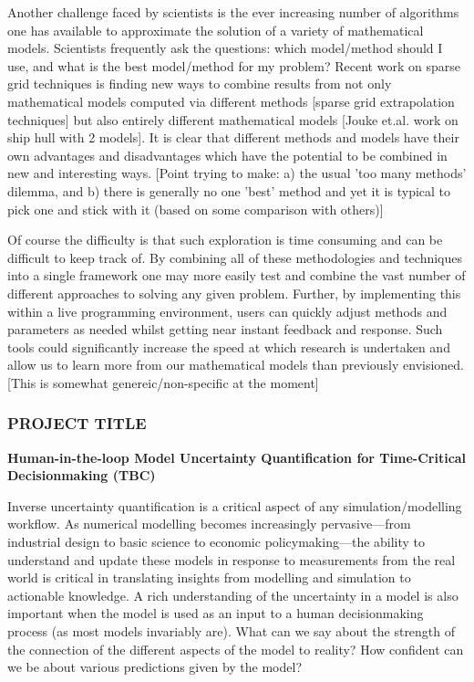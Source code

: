 \documentclass[a4paper,fontsize=12pt]{scrartcl}
\begin{document}
Another challenge faced by scientists is the ever increasing number of
algorithms one has available to approximate the solution of a variety
of mathematical models. Scientists frequently ask the questions: which
model/method should I use, and what is the best model/method for my
problem? Recent work on sparse grid techniques is finding new ways to
combine results from not only mathematical models computed via
different methods [sparse grid extrapolation techniques] but also
entirely different mathematical models [Jouke et.al. work on ship hull
with 2 models]. It is clear that different methods and models have
their own advantages and disadvantages which have the potential to be
combined in new and interesting ways. [Point trying to make: a) the
usual 'too many methods' dilemma, and b) there is generally no one
'best' method and yet it is typical to pick one and stick with it
(based on some comparison with others)]

Of course the difficulty is that such exploration is time consuming
and can be difficult to keep track of. By combining all of these
methodologies and techniques into a single framework one may more
easily test and combine the vast number of different approaches to
solving any given problem. Further, by implementing this within a live
programming environment, users can quickly adjust methods and
parameters as needed whilst getting near instant feedback and
response. Such tools could significantly increase the speed at which
research is undertaken and allow us to learn more from our
mathematical models than previously envisioned. [This is somewhat
genereic/non-specific at the moment]


\subsubsection*{PROJECT TITLE}

\textbf{Human-in-the-loop Model Uncertainty Quantification for
  Time-Critical Decisionmaking (TBC)}

Inverse uncertainty quantification is a critical aspect of any
simulation/modelling workflow. As numerical modelling becomes
increasingly pervasive---from industrial design to basic science to
economic policymaking---the ability to understand and update these
models in response to measurements from the real world is critical in
translating insights from modelling and simulation to actionable
knowledge. A rich understanding of the uncertainty in a model is also
important when the model is used as an input to a human decisionmaking
process (as most models invariably are). What can we say about the
strength of the connection of the different aspects of the model to
reality? How confident can we be about various predictions given by
the model?
\end{document}
